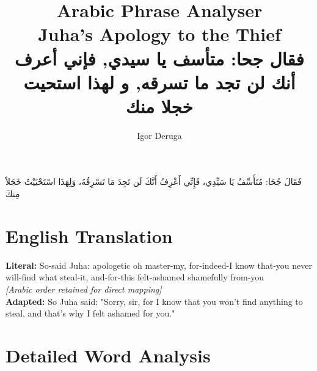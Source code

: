 \documentclass[letterpaper,12pt]{article}
\begin{document}
\title{\textbf{\Large Arabic Phrase Analyser}\\
\large Juha's Apology to the Thief\\
\normalsize \textarabic{فقال جحا: متأسف يا سيدي, فإني أعرف أنك لن تجد ما تسرقه, و لهذا استحيت خجلا منك}}
\author{Igor Deruga}
\date{}
\maketitle

\begin{tcolorbox}[colback=boxcolor,colframe=headercolor,title=\textbf{Arabic Phrase with Full Diacritics},breakable]
\centering
\textarabic{فَقَالَ جُحَا: مُتَأَسِّفٌ يَا سَيِّدِي، فَإِنِّي أَعْرِفُ أَنَّكَ لَن تَجِدَ مَا تَسْرِقُهُ، وَلِهَذَا اسْتَحْيَيْتُ خَجَلاً مِنكَ}
\end{tcolorbox}

\section{English Translation}
\begin{tcolorbox}[colback=white,colframe=accentcolor,breakable]
\textbf{Literal:} So-said Juha: apologetic oh master-my, for-indeed-I know that-you never will-find what steal-it, and-for-this felt-ashamed shamefully from-you \\
\textit{[Arabic order retained for direct mapping]}\\[0.5em]
\textbf{Adapted:} So Juha said: "Sorry, sir, for I know that you won't find anything to steal, and that's why I felt ashamed for you."
\end{tcolorbox}

\section{Detailed Word Analysis}
\end{document}

